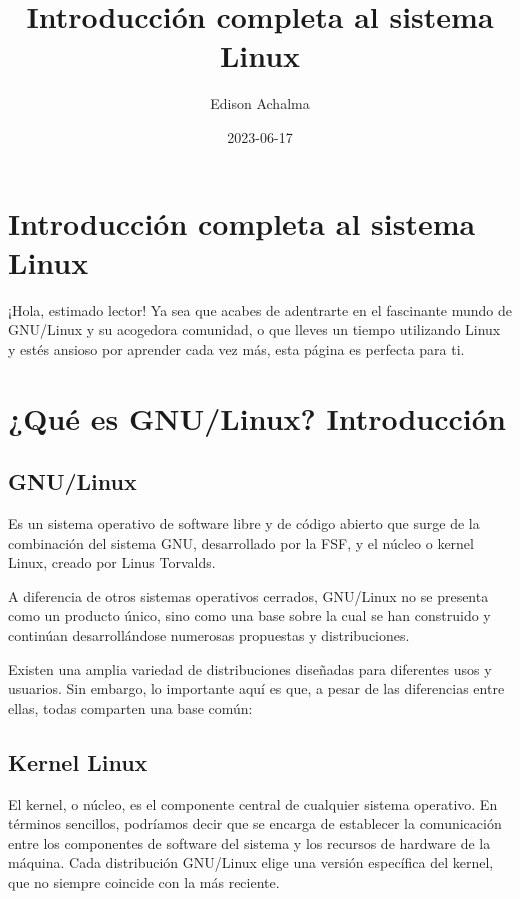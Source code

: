 \documentclass[
  jou,
  floatsintext,
  longtable,
  a4paper,
  nolmodern,
  notxfonts,
  notimes,
  12pt,
  colorlinks=true,linkcolor=blue,citecolor=blue,urlcolor=blue]{apa7}
\title{Introducción completa al sistema Linux}
\author{Edison Achalma}
\affiliation{
{Escuela Profesional de Economía, Universidad Nacional de San Cristóbal
de Huamanga}}
\date{2023-06-17}
\begin{document}
\maketitle


\hypertarget{toc}{}
\tableofcontents
\newpage
\section[Introduction]{Introducción completa al sistema Linux}

\setcounter{secnumdepth}{3}

\setlength\LTleft{0pt}




¡Hola, estimado lector! Ya sea que acabes de adentrarte en el fascinante
mundo de GNU/Linux y su acogedora comunidad, o que lleves un tiempo
utilizando Linux y estés ansioso por aprender cada vez más, esta página
es perfecta para ti.

\section{¿Qué es GNU/Linux?
Introducción}\label{quuxe9-es-gnulinux-introducciuxf3n}

\subsection{GNU/Linux}\label{gnulinux}

Es un sistema operativo de software libre y de código abierto que surge
de la combinación del sistema GNU, desarrollado por la FSF, y el núcleo
o kernel Linux, creado por Linus Torvalds.

A diferencia de otros sistemas operativos cerrados, GNU/Linux no se
presenta como un producto único, sino como una base sobre la cual se han
construido y continúan desarrollándose numerosas propuestas y
distribuciones.

Existen una amplia variedad de distribuciones diseñadas para diferentes
usos y usuarios. Sin embargo, lo importante aquí es que, a pesar de las
diferencias entre ellas, todas comparten una base común:

\subsection{Kernel Linux}\label{kernel-linux}

El kernel, o núcleo, es el componente central de cualquier sistema
operativo. En términos sencillos, podríamos decir que se encarga de
establecer la comunicación entre los componentes de software del sistema
y los recursos de hardware de la máquina. Cada distribución GNU/Linux
elige una versión específica del kernel, que no siempre coincide con la
más reciente.
\end{document}
